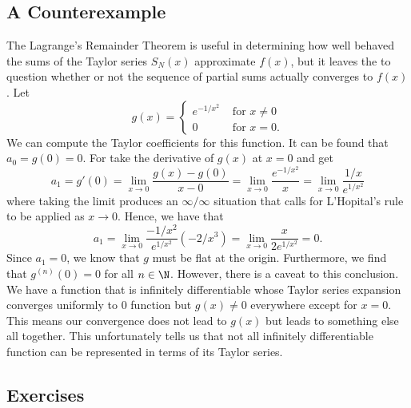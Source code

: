 \subsection{A Counterexample}

The Lagrange's Remainder Theorem is useful in determining how well behaved the sums of the Taylor series \( S_N(x) \) approximate \( f(x) \), but it leaves the to question whether or not the sequence of partial sums actually converges to \( f(x) \). Let 
\[  g(x) = 
\begin{cases}
    e^{-1/x^2} &\text{ for } x \neq 0  \\
    0 &\text{ for } x = 0. 
\end{cases} \]
We can compute the Taylor coefficients for this function. It can be found that \( a_{0 }= g(0) = 0  \). For take the derivative of \( g(x)  \) at \( x = 0  \)  and get 
\[  a_1 = g'(0) = \lim_{ x \to 0 }  \frac{ g(x) - g(0)  }{ x - 0  } = \lim_{ x \to 0 }  \frac{ e^{-1/x^2} }{ x  } = \lim_{ x \to 0 }  \frac{ 1 /x  }{ e^{1/x^2} }   \] where taking the limit produces an \( \infty / \infty \) situation that calls for L'Hopital's rule to be applied as \( x \to 0  \). Hence, we have that 
\[  a_{1} = \lim_{ x \to 0 }  \frac{ -1/x^2  }{  e^{1/x^2} } (-2/x^3) = \lim_{ x \to 0  } \frac{ x }{ 2 e^{1/x^2} } = 0.\]
Since \( a_1 = 0  \), we know that \( g  \) must be flat at the origin. Furthermore, we find that \( g^{(n)}(0) = 0  \) for all \( n \in \N  \).
However, there is a caveat to this conclusion. We have a function that is infinitely differentiable whose Taylor series expansion converges uniformly to \( 0  \) function but \( g(x) \neq 0  \) everywhere except for \( x = 0  \). This means our convergence does not lead to \( g(x)  \) but leads to something else all together. This unfortunately tells us that not all infinitely differentiable function can be represented in terms of its Taylor series.

\subsection{Exercises}

